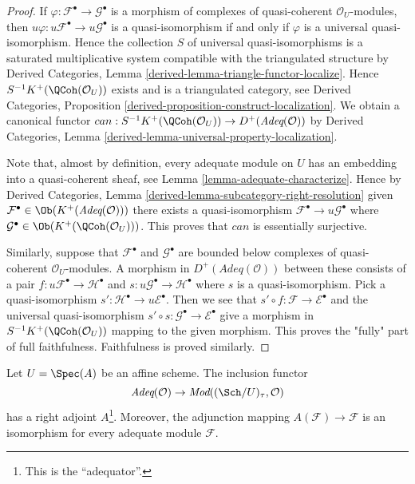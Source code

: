 \begin{proof}
If $\varphi : \mathcal{F}^\bullet \to \mathcal{G}^\bullet$
is a morphism of complexes of quasi-coherent
$\mathcal{O}_U$-modules, then $u\varphi : u\mathcal{F}^\bullet \to
u\mathcal{G}^\bullet$ is a quasi-isomorphism if and only if $\varphi$ is
a universal quasi-isomorphism. Hence the collection $S$
of universal quasi-isomorphisms is a saturated multiplicative
system compatible with the triangulated structure by
Derived Categories, Lemma \ref{derived-lemma-triangle-functor-localize}.
Hence $S^{-1}K^+(\QCoh(\mathcal{O}_U))$ exists and is a
triangulated category, see
Derived Categories, Proposition
\ref{derived-proposition-construct-localization}.
We obtain a canonical functor
$can : S^{-1}K^+(\QCoh(\mathcal{O}_U)) \to
D^{+}(\textit{Adeq}(\mathcal{O}))$ by
Derived Categories, Lemma \ref{derived-lemma-universal-property-localization}.

\medskip\noindent
Note that, almost by definition, every adequate module on $U$ has an
embedding into a quasi-coherent sheaf, see
Lemma \ref{lemma-adequate-characterize}. Hence by
Derived Categories, Lemma \ref{derived-lemma-subcategory-right-resolution}
given $\mathcal{F}^\bullet \in \Ob(K^+(\textit{Adeq}(\mathcal{O})))$
there exists a quasi-isomorphism
$\mathcal{F}^\bullet \to u\mathcal{G}^\bullet$
where $\mathcal{G}^\bullet \in \Ob(K^+(\QCoh(\mathcal{O}_U)))$.
This proves that $can$ is essentially surjective.

\medskip\noindent
Similarly, suppose that $\mathcal{F}^\bullet$ and $\mathcal{G}^\bullet$
are bounded below complexes of quasi-coherent $\mathcal{O}_U$-modules.
A morphism in $D^+(\textit{Adeq}(\mathcal{O}))$ between these
consists of a pair $f : u\mathcal{F}^\bullet \to \mathcal{H}^\bullet$
and $s : u\mathcal{G}^\bullet \to \mathcal{H}^\bullet$ where $s$
is a quasi-isomorphism. Pick a quasi-isomorphism
$s' : \mathcal{H}^\bullet \to u\mathcal{E}^\bullet$. Then we see that
$s' \circ f : \mathcal{F} \to \mathcal{E}^\bullet$ and the
universal quasi-isomorphism
$s' \circ s : \mathcal{G}^\bullet \to \mathcal{E}^\bullet$ give
a morphism in $S^{-1}K^{+}(\QCoh(\mathcal{O}_U))$ mapping
to the given morphism. This proves the "fully" part of full faithfulness.
Faithfulness is proved similarly.
\end{proof}

\begin{lemma}
\label{lemma-right-adjoint-adequate}
Let $U = \Spec(A)$ be an affine scheme.
The inclusion functor
$$
\textit{Adeq}(\mathcal{O}) \to
\textit{Mod}((\Sch/U)_\tau, \mathcal{O})
$$
has a right adjoint $A$\footnote{This is the ``adequator''.}.
Moreover, the adjunction mapping
$A(\mathcal{F}) \to \mathcal{F}$ is an isomorphism for every
adequate module $\mathcal{F}$.
\end{lemma}

